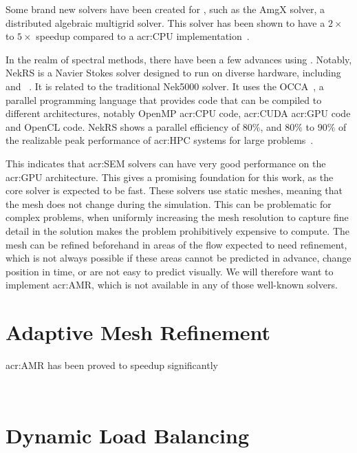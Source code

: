 Some brand new solvers have been created for , such as the AmgX solver, a
distributed algebraic multigrid solver. This solver has been shown to have a \(2 \times \) to \(5
\times \) speedup compared to a \acrshort{acr:CPU} implementation~\cite{Naumov2015}.

In the realm of spectral methods, there have been a few advances using .
Notably, NekRS is a Navier Stokes solver designed to run on diverse hardware, including
 and ~\cite{Fischer2021}. It is related to the traditional
Nek5000 solver. It uses the OCCA~\cite{Medina2014}, a parallel programming language that provides
code that can be compiled to different architectures, notably OpenMP \acrshort{acr:CPU} code,
\acrshort{acr:CUDA} \acrshort{acr:GPU} code and OpenCL code. NekRS shows a parallel efficiency of
\(80 \% \), and \(80 \% \) to \(90 \% \) of the realizable peak performance of \acrshort{acr:HPC}
systems for large problems~\cite{Fischer2021}.

This indicates that \acrshort{acr:SEM} solvers can have very good performance on the
\acrshort{acr:GPU} architecture. This gives a promising foundation for this work, as the core solver
is expected to be fast. These solvers use static meshes, meaning that the mesh does not change
during the simulation. This can be problematic for complex problems, when uniformly increasing the
mesh resolution to capture fine detail in the solution makes the problem prohibitively expensive to
compute. The mesh can be refined beforehand in areas of the flow expected to need refinement, which
is not always possible if these areas cannot be predicted in advance, change position in time, or
are not easy to predict visually. We will therefore want to implement \acrlong{acr:AMR}, which is
not available in any of those well-known solvers.

\section{Adaptive Mesh Refinement}\label{section:literature_review:amr}

\Acrshort{acr:AMR} has been proved to speedup significantly 


~\cite{Schive2018} %
~\cite{Giuliani2019} %

\section{Dynamic Load Balancing}\label{section:literature_review:load_balancing}